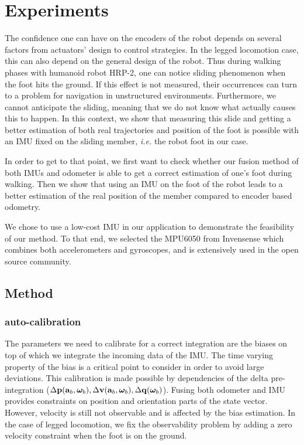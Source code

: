 
\section{Experiments} \label{sec:experiments}

The confidence one can have on the encoders of the robot depends on several factors from actuators' design to control strategies. 
In the legged locomotion case, this can also depend on the general design of the robot.
Thus during walking phases with humanoid robot HRP-2, one can notice sliding phenomenon when the foot hits the ground. 
If this effect is not measured, their occurrences can turn to a problem for navigation in unstructured environments. 
Furthermore, we cannot anticipate the sliding, meaning that we do not know what actually causes this to happen. 
In this context, we show that measuring this slide and getting a better estimation of both real trajectories and position of the foot is possible with an IMU fixed on the sliding member, {\em i.e.} the robot foot in our case.

In order to get to that point, we first want to check whether our fusion method of both IMUs and odometer is able to get a correct estimation of one's foot during walking.
Then we show that using an IMU on the foot of the robot leads to a better estimation of the real position of the member compared to encoder based odometry.

We chose to use a low-cost IMU in our application to demonstrate the feasibility of our method. 
To that end, we selected the MPU6050 from Invensense which combines both accelerometers and gyroscopes, and is extensively used in the open source community.



\subsection{Method}
\subsubsection{auto-calibration}

The parameters we need to calibrate for a correct integration are the biases on top of which we integrate the incoming data of the IMU.
The time varying property of the bias is a critical point to consider in order to avoid large deviations. This calibration is made possible
by dependencies of the delta pre-integration (${{\Delta{\bf p}}}({\bf a}_b, {{\bm \omega}}_b), {{\Delta{\bf v}}}({\bf a}_b, {{\bm \omega}}_b), {{\Delta{\bf q}}}({{\bm \omega}}_b)$). Fusing both odometer and IMU provides constraints on position and orientation parts of
the state vector. However, velocity is still not observable and is affected by the bias estimation. In the case of legged locomotion, we fix the observability problem by adding a zero velocity constraint when the foot is on the ground.

